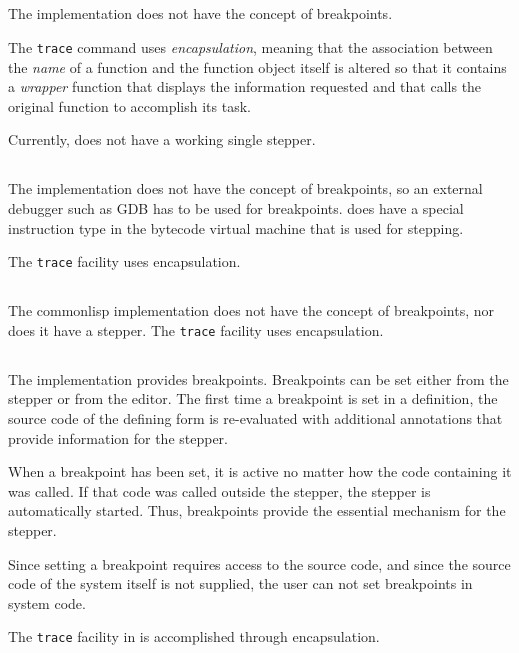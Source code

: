 \subsection{\ccl{}}

The \ccl{} \commonlisp{} implementation does not have the concept of
breakpoints.

The \ccl{} \texttt{trace} command uses \emph{encapsulation}, meaning
that the association between the \emph{name} of a function and the
function object itself is altered so that it contains a \emph{wrapper}
function that displays the information requested and that calls the
original function to accomplish its task.

Currently, \ccl{} does not have a working single stepper.

\subsection{\ecl{}}

The \ecl{} \commonlisp{} implementation does not have the concept of
breakpoints, so an external debugger such as GDB has to be used for
breakpoints.  \ecl{} does have a special instruction type in the bytecode
virtual machine that is used for stepping.

The \texttt{trace} facility uses encapsulation.

\subsection{\clasp{}}

The \clasp{} commonlisp{} implementation does not have the concept of
breakpoints, nor does it have a stepper.  The \texttt{trace} facility
uses encapsulation.

\subsection{\lispworks{}}

The \lispworks{} \commonlisp{} implementation provides breakpoints.
Breakpoints can be set either from the stepper or from the editor.
The first time a breakpoint is set in a definition, the source code of
the defining form is re-evaluated with additional annotations that
provide information for the stepper.

When a breakpoint has been set, it is active no matter how the code
containing it was called.  If that code was called outside the
stepper, the stepper is automatically started.  Thus, breakpoints
provide the essential mechanism for the stepper.

Since setting a breakpoint requires access to the source code, and
since the source code of the system itself is not supplied, the user
can not set breakpoints in system code.

The \texttt{trace} facility in \lispworks{} is accomplished through
encapsulation.

\subsection{\allegro{}}


